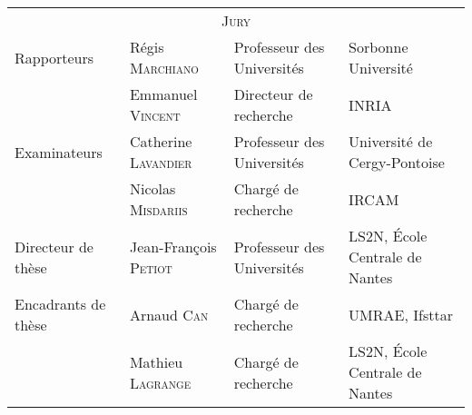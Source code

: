 \begin{cover}

  \noindent
  \begin{tabular}{llll} %
    \multicolumn{4}{c}{\scshape\color{teal}\Large Jury} \\[10pt]
    Rapporteurs & Régis \textsc{Marchiano} & Professeur des Universités & Sorbonne Université\\
                & Emmanuel \textsc{Vincent} & Directeur de recherche & INRIA \\[10pt]
    Examinateurs & Catherine \textsc{Lavandier} & Professeur des Universités & Université de Cergy-Pontoise
    \\
                & Nicolas \textsc{Misdariis} & Chargé de recherche & IRCAM \\[10pt]
    Directeur de thèse & Jean-François \textsc{Petiot} & Professeur des Universités & LS2N, École Centrale de Nantes \\
    Encadrants de thèse & Arnaud \textsc{Can} & Chargé de recherche & UMRAE, Ifsttar \\
     & Mathieu \textsc{Lagrange} & Chargé de recherche & LS2N, École Centrale de Nantes 
  \end{tabular}
\end{cover}